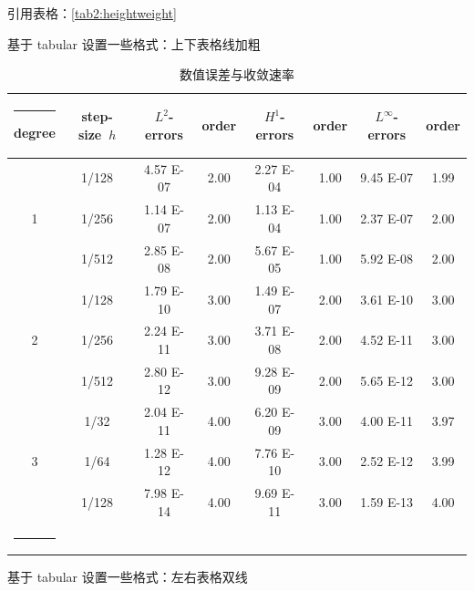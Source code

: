 \documentclass{shnuthesis}
\begin{document}
引用表格：\autoref{tab2:heightweight}

\clearpage
基于 tabular 设置一些格式：上下表格线加粗

\begin{table}[!htp]
\centering
\caption{数值误差与收敛速率}
\renewcommand\arraystretch{1.2} %
\makeatletter
\def\hlinew#1{\noalign{\ifnum0=`}\fi\hrule \@height #1 \futurelet\reserved@a\@xhline}
\makeatother
\label{table1}
\begin{tabular}{c|c|cc|cc|cc}
\hlinew{0.9pt}  %
degree &  step-size~$h$  & $L^2$-errors  &  order  & $H^1$-errors & order & $L^\infty$-errors  &  order \\
\hline
   &  1/128     & 4.57 E-07    &2.00     & 2.27 E-04  &1.00          & 9.45 E-07   &1.99    \\
1  &  1/256    & 1.14 E-07     &2.00    & 1.13 E-04  &1.00          & 2.37 E-07   &2.00      \\
   &  1/512    & 2.85 E-08     &2.00    & 5.67 E-05  &1.00          & 5.92 E-08   &2.00       \\
\hline  %
   &  1/128    & 1.79 E-10    &3.00      & 1.49 E-07  &2.00            & 3.61 E-10  &3.00       \\
2  &  1/256     & 2.24 E-11     &3.00       & 3.71 E-08  &2.00         & 4.52 E-11   &3.00      \\
   &  1/512     & 2.80 E-12     &3.00       & 9.28 E-09  &2.00        & 5.65 E-12   &3.00     \\
\hline  %
   &  1/32      & 2.04 E-11    &4.00      & 6.20 E-09  &3.00           & 4.00 E-11   &3.97       \\
3  &  1/64     & 1.28 E-12     &4.00     & 7.76 E-10  &3.00           & 2.52 E-12   &3.99       \\
   &  1/128     & 7.98 E-14     &4.00     & 9.69 E-11  &3.00           & 1.59 E-13   &4.00       \\
\hlinew{0.9pt}
\end{tabular}
\end{table}


基于 tabular 设置一些格式：左右表格双线
\end{document}
